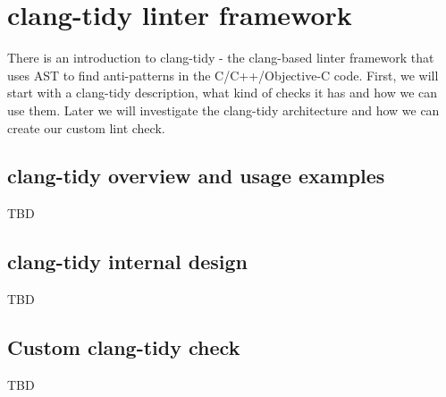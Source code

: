 \chapter{\textbf{clang-tidy linter framework}}
\pagestyle{fancy}
\fancyhf{}
\rhead{\thepage}
There is an introduction to clang-tidy - the clang-based linter framework that
uses AST to find anti-patterns in the C/C++/Objective-C code. First, we will start with
a clang-tidy description, what kind of checks it has and how we can use
them. Later we will investigate the clang-tidy architecture and how we can
create our custom lint check. 
\label{ch:clangtidy}

\section{clang-tidy overview and usage examples}
TBD

\section{clang-tidy internal design}

TBD

\section{Custom clang-tidy check}

TBD

